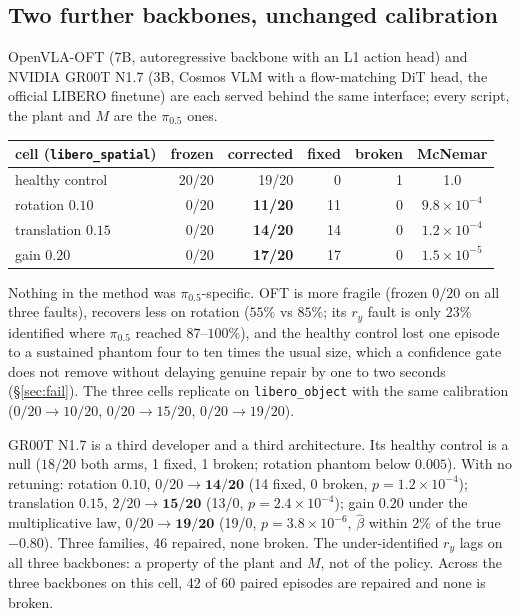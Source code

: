 \documentclass{article}
\newcommand{\code}[1]{\texttt{\small #1}}
\begin{document}
\subsection{Two further backbones, unchanged calibration}
\label{sec:oft}

OpenVLA-OFT (7B, autoregressive backbone with an L1 action head) and NVIDIA GR00T N1.7
(3B, Cosmos VLM with a flow-matching DiT head, the official LIBERO finetune) are each
served behind the same interface; every script, the plant and $M$ are the $\pi_{0.5}$ ones.

\begin{center}\small
\begin{tabular}{lrrrrc}
\toprule
cell (\code{libero\_spatial}) & frozen & corrected & fixed & broken & McNemar \\
\midrule
healthy control & 20/20 & 19/20 & 0 & 1 & 1.0 \\
rotation $0.10$ & 0/20 & \textbf{11/20} & 11 & 0 & $9.8\times10^{-4}$ \\
translation $0.15$ & 0/20 & \textbf{14/20} & 14 & 0 & $1.2\times10^{-4}$ \\
gain $0.20$ & 0/20 & \textbf{17/20} & 17 & 0 & $1.5\times10^{-5}$ \\
\bottomrule
\end{tabular}
\end{center}

Nothing in the method was $\pi_{0.5}$-specific. OFT is more fragile (frozen $0/20$ on all
three faults), recovers less on rotation ($55\%$ vs $85\%$; its $r_y$ fault is only $23\%$
identified where $\pi_{0.5}$ reached $87$--$100\%$), and the healthy control lost one episode
to a sustained phantom four to ten times the usual size, which a confidence gate does not
remove without delaying genuine repair by one to two seconds (\S\ref{sec:fail}). The three
cells replicate on \code{libero\_object} with the same calibration ($0/20\to10/20$,
$0/20\to15/20$, $0/20\to19/20$).

GR00T N1.7 is a third developer and a third architecture. Its healthy control is a null
($18/20$ both arms, 1 fixed, 1 broken; rotation phantom below $0.005$). With no retuning: rotation $0.10$,
$0/20\to\mathbf{14/20}$ (14 fixed, 0 broken, $p=1.2\times10^{-4}$); translation $0.15$,
$2/20\to\mathbf{15/20}$ (13/0, $p=2.4\times10^{-4}$); gain $0.20$ under the multiplicative
law, $0/20\to\mathbf{19/20}$ (19/0, $p=3.8\times10^{-6}$, $\hat\beta$ within $2\%$ of the
true $-0.80$). Three families, 46 repaired, none broken. The under-identified $r_y$ lags on
all three backbones: a property of the plant and $M$, not of the policy. Across the three
backbones on this cell, 42 of 60 paired episodes are repaired and none is broken.
\end{document}
